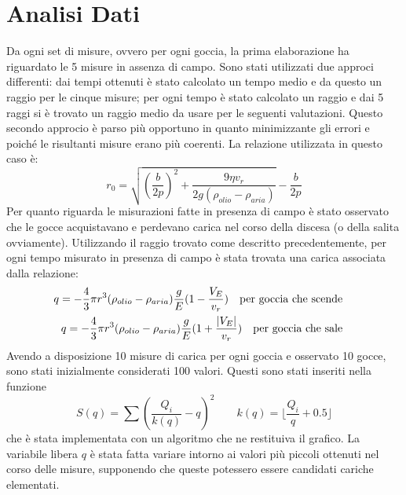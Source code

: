 \documentclass{article}
\begin{document}
\section{Analisi Dati}
    Da ogni set di misure, ovvero per ogni goccia, la prima elaborazione ha riguardato le 5 misure in assenza di campo. Sono stati utilizzati due approci differenti: dai tempi ottenuti è stato calcolato un tempo medio e da questo un raggio per le cinque misure; per ogni tempo è stato calcolato un raggio e dai 5 raggi si è trovato un raggio medio da usare per le seguenti valutazioni. Questo secondo approcio è parso più opportuno in quanto minimizzante gli errori e poiché le risultanti misure erano più coerenti. La relazione utilizzata in questo caso è: 
        \[r_0 = \sqrt{(\frac{b}{2p})^2+\frac{9\eta v_r}{2g(\rho_{olio}-\rho_{aria})}}-\frac{b}{2p}\]
    Per quanto riguarda le misurazioni fatte in presenza di campo è stato osservato che le gocce acquistavano e perdevano carica nel corso della discesa (o della salita ovviamente). Utilizzando il raggio trovato come descritto precedentemente, per ogni tempo misurato in presenza di campo è stata trovata una carica associata dalla relazione:
        \begin{align}
            q = -\frac{4}{3}\pi r^3(\rho_{olio}-\rho_{aria})\frac{g}{E}(1-\frac{V_E}{v_r}) \qq{per goccia che scende} \\
            q = -\frac{4}{3}\pi r^3(\rho_{olio}-\rho_{aria})\frac{g}{E}(1+ \frac{|V_E|}{v_r}) \qq{per goccia che sale}
        \end{align}
    Avendo a disposizione 10 misure di carica per ogni goccia e osservato 10 gocce, sono stati inizialmente considerati 100 valori. Questi sono stati inseriti nella funzione
        \[S(q) = \sum (\frac{Q_i}{k(q)}-q)^2 \quad  \quad k(q) = \lfloor \frac{Q_i}{q} +0.5 \rfloor   \]
    che è stata implementata con un algoritmo che ne restituiva il grafico. La variabile libera $q$ è stata fatta variare intorno ai valori più piccoli ottenuti nel corso delle misure, supponendo che queste potessero essere candidati cariche elementati.
\end{document}
